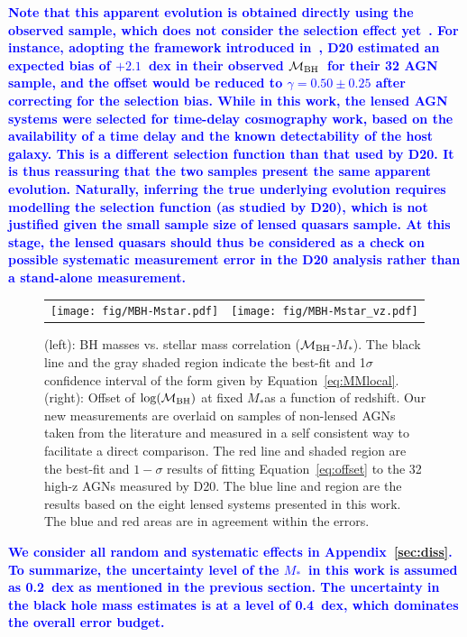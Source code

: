 \documentclass[fleqn,usenatbib]{mnras}
\newcommand{\mbh}{$\mathcal M_{\rm BH}$}
\newcommand{\mstar}{{$M_*$}}
\newcommand{\blue}[1]{{\bf \textcolor{blue}{#1}}}
\begin{document}
\blue{
Note that this apparent evolution is obtained directly using the observed sample, which does not consider the selection effect yet~\citep{Tre++07,Schulze2011,Bennert++2011, Schulze2014,Park15}. For instance, adopting the framework introduced in~\citet{Schulze2015}, D20 estimated an expected bias of $+2.1$~dex in their observed \mbh\ for their 32 AGN sample, and the offset would be reduced to $\gamma=0.50\pm0.25$ after correcting for the selection bias. While in this work, the
lensed AGN systems were selected for time-delay cosmography work, based on the availability of a time delay and the known detectability of the host galaxy. This is a different selection function than that used by D20. It is thus reassuring that the two samples present the same apparent evolution. Naturally, inferring the true underlying evolution requires modelling the selection function (as studied by D20), which is not justified given the small sample size of lensed quasars sample. At this stage, the lensed quasars should thus be considered as a check on possible systematic measurement error in the D20 analysis rather than a stand-alone measurement.}


\begin{figure}
\centering
\begin{tabular}{c c}
{\texttt{[image: fig/MBH-Mstar.pdf]}}&
{\texttt{[image: fig/MBH-Mstar\_vz.pdf]}}\\
\end{tabular}
\caption{\label{fig:scaling_relation} 
(left): BH masses vs. stellar mass correlation (\mbh-\mstar). The black line and the gray shaded region indicate the best-fit and 1$\sigma$ confidence interval of the form given by Equation~\ref{eq:MMlocal}.
(right): Offset of $\log(\mathcal M_{\rm BH})$ at fixed \mstar as a function of redshift. Our new measurements are overlaid on samples of non-lensed AGNs taken from the literature and measured in a self consistent way to facilitate a direct comparison. The red line and shaded region are the best-fit and $1-\sigma$ results of fitting  Equation~\eqref{eq:offset} to the 32 high-z AGNs measured by D20. The blue line and region are the results based on the eight lensed systems presented in this work. The blue and red areas are in agreement within the errors.}
\end{figure} 

\blue{
We consider all random and systematic effects in Appendix~\ref{sec:diss}. To summarize, the uncertainty level of the \mstar\ in this work is assumed as 0.2~dex  as mentioned in the previous section. The uncertainty in the black hole mass estimates is at a level of 0.4~dex, which dominates the overall error budget.
}
\end{document}
